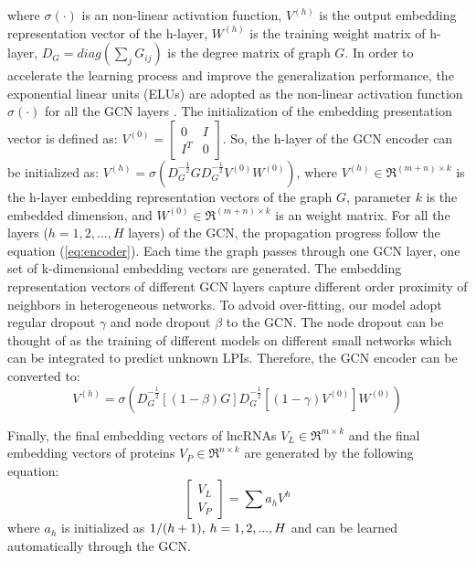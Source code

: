 \documentclass[fleqn,10pt]{wlscirep}
\begin{document}
where $\sigma ( \cdot )$ is an non-linear activation function, ${V^{(h)}}$ is the output embedding representation vector of the h-layer, $W^{(h)}$ is the training weight matrix of h-layer, ${D_G} = diag(\sum\nolimits_j {{G_{ij}}} )$ is the degree matrix of graph $G$. In order to accelerate the learning process and improve the generalization performance, the exponential linear units (ELUs) are adopted as the non-linear activation function $\sigma ( \cdot )$ for all the GCN layers \cite{Clevert2016}. The initialization of the embedding presentation vector is defined as: ${V^{(0)}} = \left[ {\begin{array}{*{20}{c}} 0&I\\ {{I^T}}&0 \end{array}} \right]$. So, the h-layer of the GCN encoder can be initialized as: ${V^{(h)}} = \sigma ({D_G^{ - \frac{1}{2}}}G{D_G^{ - \frac{1}{2}}}{V^{(0)}}{W^{(0)}})$, where ${V^{(h)}} \in {\Re ^{(m + n) \times k}}$ is the h-layer embedding representation vectors of the graph $G$, parameter $k$ is the embedded dimension, and ${W^{(0)}} \in {\Re ^{(m + n) \times k}}$ is an weight matrix. For all the layers ($h=1,2,...,H$ layers) of the GCN, the propagation progress follow the equation (\ref{eq:encoder}). Each time the graph passes through one GCN layer, one set of k-dimensional embedding vectors are generated. The embedding representation vectors of different GCN layers capture different order proximity of neighbors in heterogeneous networks. To advoid over-fitting, our model adopt regular dropout $\gamma $  and node dropout $\beta $ to the GCN. The node dropout can be thought of as the training of different models on different small networks which can be integrated to predict unknown LPIs. Therefore, the GCN encoder can be converted to:
\begin{equation}
{V^{(h)}} = \sigma ({D_G^{ - \frac{1}{2}}}[(1-\beta)G]{D_G^{ - \frac{1}{2}}}[(1-\gamma){V^{(0)}}]{W^{(0)}})
\end{equation}

Finally, the final embedding vectors of lncRNAs ${V_L} \in {\Re ^{m \times k}}$ and the final embedding vectors of proteins ${V_P} \in {\Re ^{n \times k}}$ are generated by the following equation: 
\begin{equation}
\left[ {\begin{array}{*{20}{c}} {{V_L}}\\ {{V_P}} \end{array}} \right] = \sum {{a_h}{V^h}}
\end{equation}
where ${a_h}$ is initialized as $1/(h + 1),{\kern 1pt} {\kern 1pt} h = 1,2,...,H$ and can be learned automatically through the GCN. 
\end{document}
